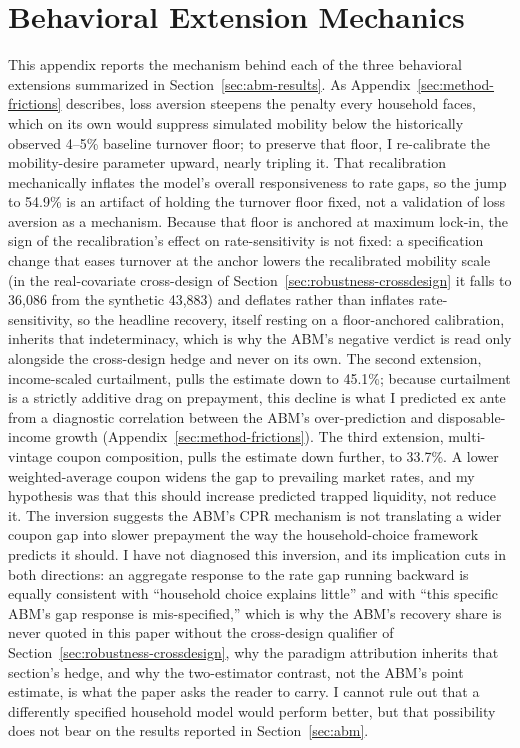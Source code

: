 \documentclass[12pt]{article}
\begin{document}
\section{Behavioral Extension Mechanics}\label{sec:robustness-extensions}

This appendix reports the mechanism behind each of the three behavioral extensions summarized in Section~\ref{sec:abm-results}. As Appendix~\ref{sec:method-frictions} describes, loss aversion steepens the penalty every household faces, which on its own would suppress simulated mobility below the historically observed 4--5\% baseline turnover floor; to preserve that floor, I re-calibrate the mobility-desire parameter upward, nearly tripling it. That recalibration mechanically inflates the model's overall responsiveness to rate gaps, so the jump to 54.9\% is an artifact of holding the turnover floor fixed, not a validation of loss aversion as a mechanism. Because that floor is anchored at maximum lock-in, the sign of the recalibration's effect on rate-sensitivity is not fixed: a specification change that eases turnover at the anchor lowers the recalibrated mobility scale (in the real-covariate cross-design of Section~\ref{sec:robustness-crossdesign} it falls to 36,086 from the synthetic 43,883) and deflates rather than inflates rate-sensitivity, so the headline recovery, itself resting on a floor-anchored calibration, inherits that indeterminacy, which is why the ABM's negative verdict is read only alongside the cross-design hedge and never on its own. The second extension, income-scaled curtailment, pulls the estimate down to 45.1\%; because curtailment is a strictly additive drag on prepayment, this decline is what I predicted ex ante from a diagnostic correlation between the ABM's over-prediction and disposable-income growth (Appendix~\ref{sec:method-frictions}). The third extension, multi-vintage coupon composition, pulls the estimate down further, to 33.7\%. A lower weighted-average coupon widens the gap to prevailing market rates, and my hypothesis was that this should increase predicted trapped liquidity, not reduce it. The inversion suggests the ABM's CPR mechanism is not translating a wider coupon gap into slower prepayment the way the household-choice framework predicts it should. I have not diagnosed this inversion, and its implication cuts in both directions: an aggregate response to the rate gap running backward is equally consistent with ``household choice explains little'' and with ``this specific ABM's gap response is mis-specified,'' which is why the ABM's recovery share is never quoted in this paper without the cross-design qualifier of Section~\ref{sec:robustness-crossdesign}, why the paradigm attribution inherits that section's hedge, and why the two-estimator contrast, not the ABM's point estimate, is what the paper asks the reader to carry. I cannot rule out that a differently specified household model would perform better, but that possibility does not bear on the results reported in Section~\ref{sec:abm}.
\end{document}
